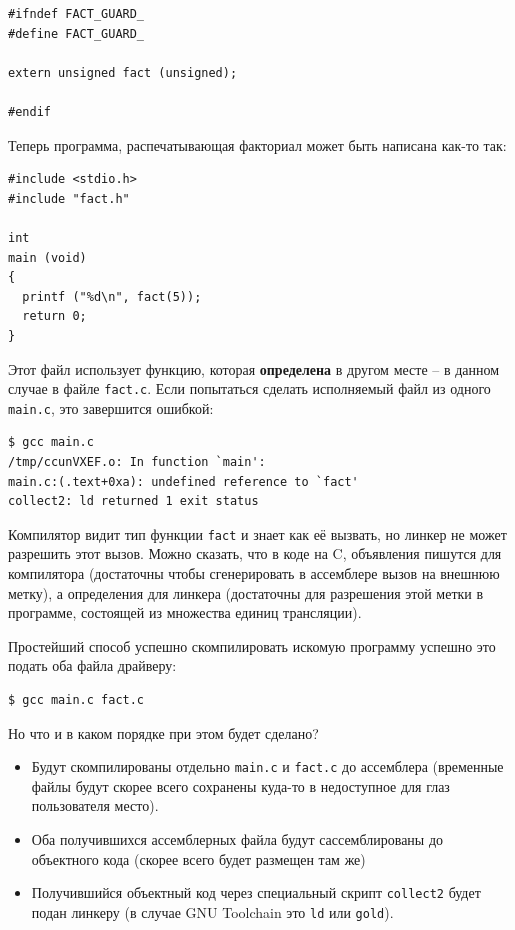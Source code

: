 \documentclass[a4paper,12pt,oneside]{article}
\begin{document}
\begin{lstlisting}
#ifndef FACT_GUARD_
#define FACT_GUARD_

extern unsigned fact (unsigned);

#endif
\end{lstlisting}

Теперь программа, распечатывающая факториал может быть написана как-то так:

\begin{lstlisting}
#include <stdio.h>
#include "fact.h"

int
main (void)
{
  printf ("%d\n", fact(5));
  return 0;
}
\end{lstlisting}

Этот файл использует функцию, которая \textbf{определена} в другом месте -- в данном случае в файле \lstinline!fact.с!. Если попытаться сделать исполняемый файл из одного \lstinline!main.c!, это завершится ошибкой:

\begin{verbatim}
$ gcc main.c
/tmp/ccunVXEF.o: In function `main':
main.c:(.text+0xa): undefined reference to `fact'
collect2: ld returned 1 exit status
\end{verbatim}

Компилятор видит тип функции \lstinline!fact! и знает как её вызвать, но линкер не может разрешить этот вызов. Можно сказать, что в коде на C, объявления пишутся для компилятора (достаточны чтобы сгенерировать в ассемблере вызов на внешнюю метку), а определения для линкера (достаточны для разрешения этой метки в программе, состоящей из множества единиц трансляции). 

Простейший способ успешно скомпилировать искомую программу успешно это подать оба файла драйверу:

\begin{verbatim}
$ gcc main.c fact.c
\end{verbatim}

Но что и в каком порядке при этом будет сделано?

\begin{itemize}
\item Будут скомпилированы отдельно \lstinline!main.c! и \lstinline!fact.c! до ассемблера (временные файлы будут скорее всего сохранены куда-то в недоступное для глаз пользователя место).
\item Оба получившихся ассемблерных файла будут сассемблированы до объектного кода (скорее всего будет размещен там же)
\item Получившийся объектный код через специальный скрипт \lstinline!collect2! будет подан линкеру (в случае GNU Toolchain это \lstinline!ld! или \lstinline!gold!).
\end{itemize}
\end{document}
